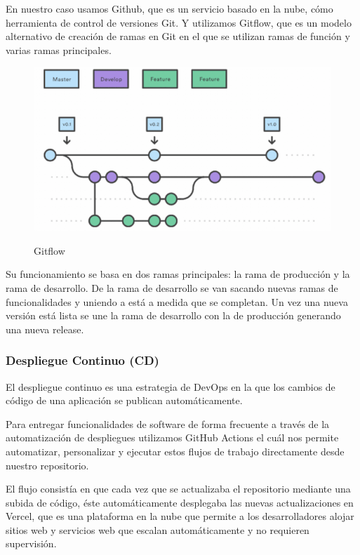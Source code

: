 \documentclass[12pt,twoside,titlepage]{report}
\begin{document}
En nuestro caso usamos Github, que es un servicio basado en la nube, cómo herramienta de control de versiones Git. Y utilizamos Gitflow, que es un modelo alternativo de creación de ramas en Git en el que se utilizan ramas de función y varias ramas principales.

\begin{figure}[H]
    \centering
    \includegraphics[scale=0.58]{Gitflow}
    \label{fig:Gitflow}
    \caption{Gitflow}
\end{figure}

Su funcionamiento se basa en dos ramas principales: la rama de producción y la rama de desarrollo. De la rama de desarrollo se van sacando nuevas ramas de funcionalidades y uniendo a está a medida que se completan. Un vez una nueva versión está lista se une la rama de desarrollo con la de producción generando una nueva release.

\subsubsection{Despliegue Continuo (CD)}

El despliegue continuo es una estrategia de DevOps en la que los cambios de código de una aplicación se publican automáticamente.

Para entregar funcionalidades de software de forma frecuente a través de la automatización de despliegues utilizamos GitHub Actions el cuál nos permite automatizar, personalizar y ejecutar estos flujos de trabajo directamente desde nuestro repositorio.

El flujo consistía en que cada vez que se actualizaba el repositorio mediante una subida de código, éste automáticamente desplegaba las nuevas actualizaciones en Vercel, que es una plataforma en la nube que permite a los desarrolladores alojar sitios web y servicios web que escalan automáticamente y no requieren supervisión.
\end{document}
